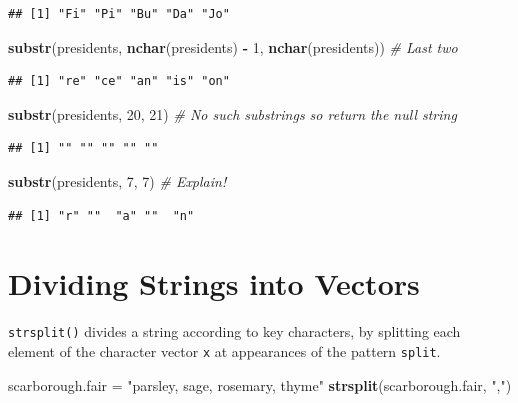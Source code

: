 \documentclass[
]{book}
\newenvironment{Shaded}{\begin{snugshade}}{\end{snugshade}}
\newcommand{\CommentTok}[1]{\textcolor[rgb]{0.56,0.35,0.01}{\textit{#1}}}
\newcommand{\DecValTok}[1]{\textcolor[rgb]{0.00,0.00,0.81}{#1}}
\newcommand{\KeywordTok}[1]{\textcolor[rgb]{0.13,0.29,0.53}{\textbf{#1}}}
\newcommand{\NormalTok}[1]{#1}
\newcommand{\OperatorTok}[1]{\textcolor[rgb]{0.81,0.36,0.00}{\textbf{#1}}}
\newcommand{\StringTok}[1]{\textcolor[rgb]{0.31,0.60,0.02}{#1}}
\begin{document}
\begin{verbatim}
## [1] "Fi" "Pi" "Bu" "Da" "Jo"
\end{verbatim}

\begin{Shaded}
\begin{Highlighting}[]
\KeywordTok{substr}\NormalTok{(presidents, }\KeywordTok{nchar}\NormalTok{(presidents) }\OperatorTok{-}\StringTok{ }\DecValTok{1}\NormalTok{, }\KeywordTok{nchar}\NormalTok{(presidents))  }\CommentTok{# Last two}
\end{Highlighting}
\end{Shaded}

\begin{verbatim}
## [1] "re" "ce" "an" "is" "on"
\end{verbatim}

\begin{Shaded}
\begin{Highlighting}[]
\KeywordTok{substr}\NormalTok{(presidents, }\DecValTok{20}\NormalTok{, }\DecValTok{21}\NormalTok{)  }\CommentTok{# No such substrings so return the null string}
\end{Highlighting}
\end{Shaded}

\begin{verbatim}
## [1] "" "" "" "" ""
\end{verbatim}

\begin{Shaded}
\begin{Highlighting}[]
\KeywordTok{substr}\NormalTok{(presidents, }\DecValTok{7}\NormalTok{, }\DecValTok{7}\NormalTok{)  }\CommentTok{# Explain!}
\end{Highlighting}
\end{Shaded}

\begin{verbatim}
## [1] "r" ""  "a" ""  "n"
\end{verbatim}

\hypertarget{dividing-strings-into-vectors}{%
\section{Dividing Strings into Vectors}\label{dividing-strings-into-vectors}}

\texttt{strsplit()} divides a string according to key characters, by splitting each element of the character vector \texttt{x} at appearances of the pattern \texttt{split}.

\begin{Shaded}
\begin{Highlighting}[]
\NormalTok{scarborough.fair =}\StringTok{ "parsley, sage, rosemary, thyme"}
\KeywordTok{strsplit}\NormalTok{(scarborough.fair, }\StringTok{","}\NormalTok{)}
\end{Highlighting}
\end{Shaded}
\end{document}
